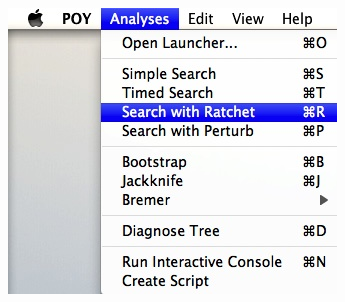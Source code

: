 {\begin{figure}
\centering
\begin{minipage}[c]{0.45\textwidth}
   		\includegraphics[width=\textwidth]{doc/figures/searchwithratchet_menu.jpg}
\end{minipage}
\,
\begin{minipage}[c]{0.52\textwidth}

\end{minipage}
\end{figure}}
